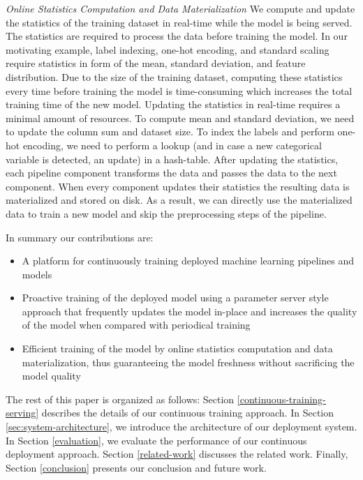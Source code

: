 \textit{Online Statistics Computation and Data Materialization}
We compute and update the statistics of the training dataset in real-time while the model is being served. 
The statistics are required to process the data before training the model.
In our motivating example, label indexing, one-hot encoding, 
and standard scaling require statistics in form of the mean, standard deviation, and feature distribution.
Due to the size of the training dataset, computing these statistics every time before training the model is time-consuming which increases the total training time of the new model.
Updating the statistics in real-time requires a minimal amount of resources. 
To compute mean and standard deviation, we need to update the column sum and dataset size.
To index the labels and perform one-hot encoding, we need to perform a lookup (and in case a new categorical variable is detected, an update) in a hash-table. 
After updating the statistics, each pipeline component transforms the data and passes the data to the next component.
When every component updates their statistics the resulting data is materialized and stored on disk.
As a result, we can directly use the materialized data to train a new model and skip the preprocessing steps of the pipeline.

In summary our contributions are:
\begin{itemize}
\item A platform for continuously training deployed machine learning pipelines and models
\item Proactive training of the deployed model using a parameter server style approach that frequently updates the model in-place and increases the quality of the model when compared with periodical training
\item Efficient training of the model by online statistics computation and data materialization, thus guaranteeing the model freshness without sacrificing the model quality
\end{itemize}

The rest of this paper is organized as follows:
Section \ref{continuous-training-serving} describes the details of our continuous training approach.
In Section \ref{sec:system-architecture}, we introduce the architecture of our deployment system.
In Section \ref{evaluation}, we evaluate the performance of our continuous deployment approach.
Section \ref {related-work} discusses the related work.
Finally, Section \ref{conclusion} presents our conclusion and future work.
